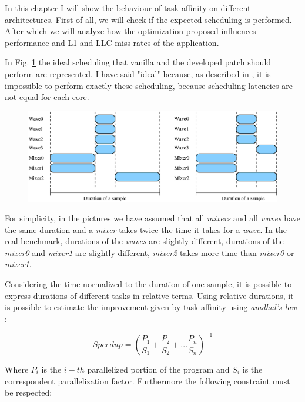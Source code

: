 In this chapter I will show the behaviour of task-affinity on different architectures. First of all, we will check if the expected scheduling is performed. 
After which we will analyze how the optimization proposed influences performance and L1 and LLC miss rates of the application. 

In Fig. \ref{fig:ideal_scheduling} the ideal scheduling that vanilla and the developed patch should perform are represented.
I have said "ideal" because, as described in \cite{lcs}, it is impossible to perform exactly these scheduling, because scheduling latencies are not equal 
for each core.

\begin{figure}[htbp]
\centering
\includegraphics[width=\widefigure]{images/schedule_van_taskaff.eps}
\caption{}
\label{fig:ideal_scheduling}
\end{figure}

For simplicity, in the pictures we have assumed that all \textit{mixers} and all \textit{waves} have the same duration and a \textit{mixer} takes twice the 
time it takes for a \textit{wave}. In the real benchmark, durations of the \textit{waves} are slightly different, durations of the \textit{mixer0} and 
\textit{mixer1} are slightly different, \textit{mixer2} takes more time than \textit{mixer0} or \textit{mixer1}.

Considering the time normalized to the duration of one sample, it is possible to express durations of different tasks in relative terms.
Using relative durations, it is possible to estimate the improvement given by task-affinity using \textit{amdhal's law} \cite{lcs}:

\begin{equation}
       Speedup = \left(\frac{P_{1}}{S_{1}} + \frac{P_{2}}{S_{2}} + ... \frac{P_{n}}{S_{n}} \right)^{-1} 
\label{eq:amdhal}
\end{equation}

Where $P_{i}$ is the $i-th$ parallelized portion of the program and $S_{i}$ is the correspondent parallelization factor. Furthermore the following 
constraint must be respected:

